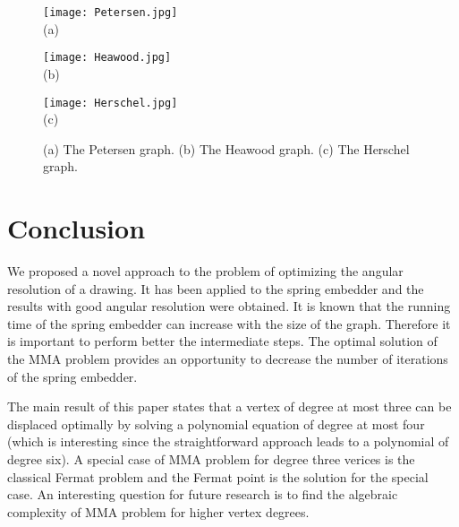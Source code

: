 \documentclass[10pt]{article}
\begin{document}
\begin{figure}[htp]
\centering
\begin{minipage}[b]{0.31\linewidth}
\centering \texttt{[image: Petersen.jpg]}\\ (a)
\end{minipage}
\begin{minipage}[b]{0.31\linewidth}
\centering \texttt{[image: Heawood.jpg]}\\ (b)
\end{minipage}
\begin{minipage}[b]{0.31\linewidth}
\centering \texttt{[image: Herschel.jpg]}\\ (c)
\end{minipage}
\caption{(a) The Petersen graph. (b) The Heawood graph.
(c) The Herschel graph.}
\label{well}
\end{figure}


\section{Conclusion} \label{concl}

We proposed a novel approach to the problem of optimizing the angular resolution of a drawing. 
It has been applied to the spring embedder and the results with good angular resolution were obtained. It is known that the running time of the spring embedder can increase with the size of the graph. Therefore it is important to perform better the intermediate steps. The optimal solution of the MMA problem provides an opportunity to decrease the number of iterations of the spring embedder. 

The main result of this paper states that a vertex of degree at most three can be displaced optimally by solving a polynomial equation of degree at most four (which is interesting since the straightforward approach leads to a polynomial of degree six). A special case of MMA problem for degree three verices is the classical Fermat problem and the Fermat point is the solution for the special case. An interesting question for future research is to find the algebraic complexity of MMA problem for higher vertex degrees.
\end{document}
